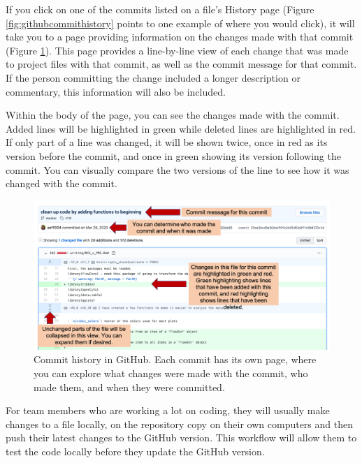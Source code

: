 \documentclass[]{tufte-book}
\begin{document}
If you click on one of the commits listed on a file's History page (Figure
\ref{fig:githubcommithistory} points to one example of where you would click),
it will take you to a page providing information on the changes made with that
commit (Figure \ref{fig:githubcommithistory2}). This page provides a
line-by-line view of each change that was made to project files with that
commit, as well as the commit message for that commit. If the person
committing the change included a longer description or commentary,
this information will also be included.

Within the body of the page, you can see the changes made with the commit. Added
lines will be highlighted in green while deleted lines are highlighted in red.
If only part of a line was changed, it will be shown twice, once in red as its
version before the commit, and once in green showing its version following the
commit. You can visually compare the two versions of the line to see how it was
changed with the commit.

\begin{figure}
\includegraphics[width=\textwidth]{figures/github_commit_history2} \caption[Commit history in GitHub]{Commit history in GitHub. Each commit has its own page, where you can explore what changes were made with the commit, who made them, and when they were committed.}\label{fig:githubcommithistory2}
\end{figure}

For team members who are working a lot on coding, they will usually make changes
to a file locally, on the repository copy on their own computers and then push
their latest changes to the GitHub version. This workflow will allow them to
test the code locally before they update the GitHub version.
\end{document}
